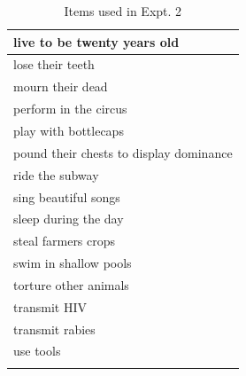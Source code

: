 \documentclass[floatsintext,doc]{apa6}
\begin{document}
\begin{longtable}{ |p{3in}|}
   \hline
live to be twenty years old \\ 
   \hline
lose their teeth \\ 
   \hline
mourn their dead \\ 
   \hline
perform in the circus \\ 
   \hline
play with bottlecaps \\ 
   \hline
pound their chests to display dominance \\ 
   \hline
ride the subway \\ 
   \hline
sing beautiful songs \\ 
   \hline
sleep during the day \\ 
   \hline
steal farmers crops \\ 
   \hline
swim in shallow pools \\ 
   \hline
torture other animals \\ 
   \hline
transmit HIV \\ 
   \hline
transmit rabies \\ 
   \hline
use tools \\ 
   \hline
\hline
\caption{Items used in Expt. 2} 
\end{longtable}
\endgroup

\newpage
\end{document}
